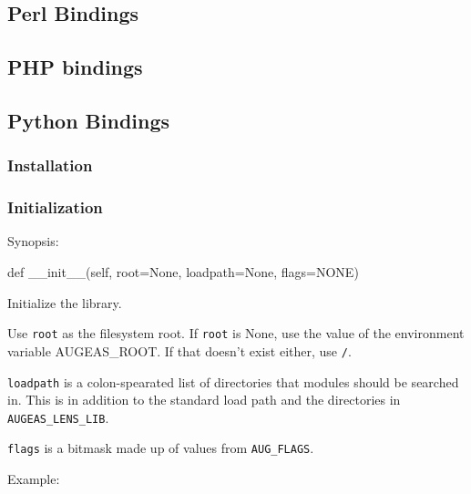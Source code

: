 

\subsection{Perl Bindings}



\subsection{PHP bindings}


\subsection{Python Bindings}



\subsubsection{Installation}

\subsubsection{Initialization}

Synopsis:

\begin{python}[]
    def __init__(self, root=None, loadpath=None, flags=NONE)
\end{python}

Initialize the library.

Use \verb!root! as the filesystem root. If \verb!root! is None, use the value of the environment variable AUGEAS\_ROOT. If that doesn't exist either, use \nolinkurl{/}.

\verb!loadpath! is a colon-spearated list of directories that modules should be searched in. This is in addition to the standard load path and the directories in \verb!AUGEAS_LENS_LIB!.

\verb!flags! is a bitmask made up of values from \verb!AUG_FLAGS!.

Example:

